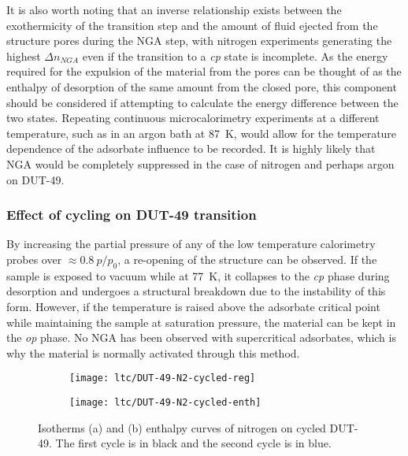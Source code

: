 It is also worth noting that an inverse relationship exists 
between the exothermicity of the transition step and the 
amount of fluid ejected from the structure pores during the NGA 
step, with nitrogen experiments generating the highest \(\Delta n_{NGA}\)
even if the transition to a \textit{cp} state is incomplete.
As the energy required for the expulsion of the material from the 
pores can be thought of as the enthalpy of desorption of the same amount
from the closed pore, this component should be considered if 
attempting to calculate the energy difference between the two states.
Repeating continuous microcalorimetry experiments at a different 
temperature, such as in an argon bath at \SI{87}{\kelvin}, would 
allow for the temperature dependence of the adsorbate influence 
to be recorded. It is highly likely that NGA would be completely 
suppressed in the case of nitrogen and perhaps argon on DUT-49.

\subsubsection{Effect of cycling on DUT-49 transition}

By increasing the partial pressure of any of the low temperature 
calorimetry probes over \(\approx 0.8~p/p_0\), a re-opening
of the structure can be observed. If the sample is exposed to 
vacuum while at \SI{77}{\kelvin}, it collapses to the \textit{cp}
phase during desorption and undergoes a structural breakdown 
due to the instability of this form. However, if the temperature 
is raised above the adsorbate critical point while maintaining the
sample at saturation pressure, the material can be kept in the 
\textit{op} phase. No NGA has been observed with supercritical 
adsorbates, which is why the material is normally activated through
this method. 

\begin{figure}[htb]
    \centering
    \begin{subfigure}[c]{0.5\linewidth}
        \texttt{[image: ltc/DUT-49-N2-cycled-reg]}%
        \caption{}\label{dut:fgr:dut-49-cycle-reg}
    \end{subfigure}%
    \begin{subfigure}[h]{0.5\linewidth}
        \centering
        \texttt{[image: ltc/DUT-49-N2-cycled-enth]}%
        \caption{}\label{dut:fgr:dut-49-cycle-enth}
    \end{subfigure}%
    \caption{Isotherms (a) and (b) enthalpy curves of nitrogen on
    cycled DUT-49. The first cycle is in black and the second 
    cycle is in blue.}%
    \label{dut:fgr:dut-49-cycle}
\end{figure}


